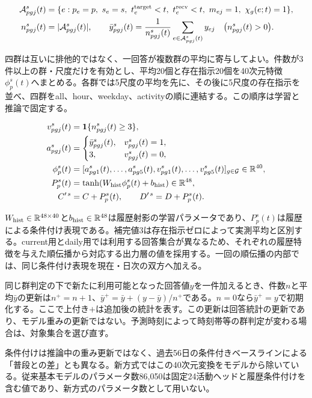 \[
\begin{aligned}
\mathcal A_{pgj}^{s}(t)
&=\{e:p_e=p,\ s_e=s,\ t_e^{\rm target}<t,\
t_e^{\rm recv}<t,\ m_{ej}=1,\ \chi_g(e;t)=1\},\\
n_{pgj}^{s}(t)&=|\mathcal A_{pgj}^{s}(t)|,\qquad
\bar y_{pgj}^{s}(t)=
\frac1{n_{pgj}^{s}(t)}
\sum_{e\in\mathcal A_{pgj}^{s}(t)}y_{ej}
\quad\bigl(n_{pgj}^{s}(t)>0\bigr).
\end{aligned}
\]

四群は互いに排他的ではなく、一回答が複数群の平均に寄与してよい。件数が3件以上の群・尺度だけを有効とし、平均20個と存在指示20個を40次元特徴\(\phi_p^{s}(t)\)へまとめる。各群では5尺度の平均を先に、その後に5尺度の存在指示を並べ、四群をall、hour、weekday、activityの順に連結する。この順序は学習と推論で固定する。

\[
\begin{aligned}
v_{pgj}^{s}(t)&=\mathbf1\{n_{pgj}^{s}(t)\ge3\},\\
a_{pgj}^{s}(t)&=
\begin{cases}
\bar y_{pgj}^{s}(t),&v_{pgj}^{s}(t)=1,\\
3,&v_{pgj}^{s}(t)=0,
\end{cases}\\
\phi_p^{s}(t)&=
[a_{pg1}^{s}(t),\ldots,a_{pg5}^{s}(t),
v_{pg1}^{s}(t),\ldots,v_{pg5}^{s}(t)]_{g\in\mathcal G}
\in\mathbb R^{40},\\
P_p^{s}(t)&=\tanh(W_{\rm hist}\phi_p^{s}(t)+b_{\rm hist})
\in\mathbb R^{48},\\
C'^{\,s}&=C+P_p^{s}(t),\qquad D'^{\,s}=D+P_p^{s}(t).
\end{aligned}
\]

\(W_{\rm hist}\in\mathbb R^{48\times40}\)と\(b_{\rm hist}\in\mathbb R^{48}\)は履歴射影の学習パラメータであり、\(P_p^{s}(t)\)は履歴による条件付け表現である。補完値3は存在指示ゼロによって実測平均と区別する。current用とdaily用では利用する回答集合が異なるため、それぞれの履歴特徴を与えた順伝播から対応する出力層の値を採用する。一回の順伝播の内部では、同じ条件付け表現を現在・日次の双方へ加える。

同じ群判定の下で新たに利用可能となった回答値\(y\)を一件加えるとき、件数\(n\)と平均\(\bar y\)の更新は\(n^+=n+1\)、\(\bar y^+=\bar y+(y-\bar y)/n^+\)である。\(n=0\)なら\(\bar y^+=y\)で初期化する。ここで上付き\(+\)は追加後の統計を表す。この更新は回答統計の更新であり、モデル重みの更新ではない。予測時刻によって時刻帯等の群判定が変わる場合は、対象集合を選び直す。

条件付けは推論中の重み更新ではなく、過去56日の条件付きベースラインによる「普段との差」とも異なる。新方式ではこの40次元変換をモデルから除いている。従来基本モデルのパラメータ数86,050は固定24活動ヘッドと履歴条件付けを含む値であり、新方式のパラメータ数として用いない。


